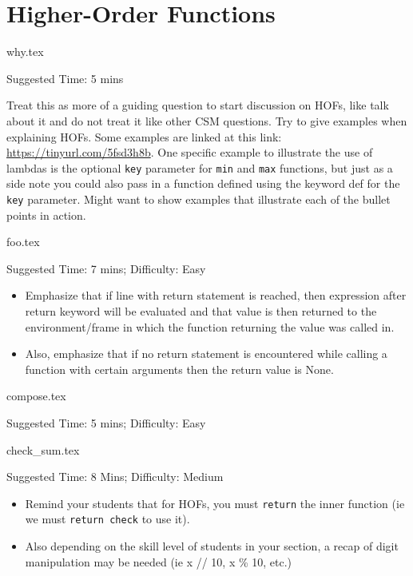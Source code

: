 \documentclass{exam}
\begin{document}
\section{Higher-Order Functions}
\begin{questions}
    {why.tex}
    \begin{questionmeta}
        Suggested Time: 5 mins
        
        Treat this as more of a guiding question to start discussion on HOFs, like talk about it and do not treat it like other CSM questions. Try to give examples when explaining HOFs. Some examples are linked at this link: \url{https://tinyurl.com/5fsd3h8b}.
        One specific example to illustrate the use of lambdas is the optional \lstinline{key} parameter for \lstinline{min} and \lstinline{max} functions, but just as a side note you could also pass in a function defined using the keyword def for the \lstinline{key} parameter.
        Might want to show examples that illustrate each of the bullet points in action. 
    \end{questionmeta}
    
    {foo.tex}
    \begin{questionmeta}
        Suggested Time: 7 mins; Difficulty: Easy
        \begin{itemize}
            \item Emphasize that if line with return statement is reached, then expression after return keyword will be evaluated and that value is then returned to the environment/frame in which the function returning the value was called in. 
            \item Also, emphasize that if no return statement is encountered while calling a function with certain arguments then the return value is None.
        \end{itemize}
    \end{questionmeta}

    {compose.tex}
    \begin{questionmeta}
        Suggested Time: 5 mins; Difficulty: Easy
    \end{questionmeta}

    {check_sum.tex}
    \begin{questionmeta}
        Suggested Time: 8 Mins; Difficulty: Medium
        \begin{itemize}
            \item Remind your students that for HOFs, you must \lstinline{return} the inner function (ie we must \lstinline{return check} to use it).
            \item Also depending on the skill level of students in your section, a recap of digit manipulation may be needed (ie x // 10, x \% 10, etc.)
        \end{itemize}
    \end{questionmeta}


\end{questions}
\end{document}
